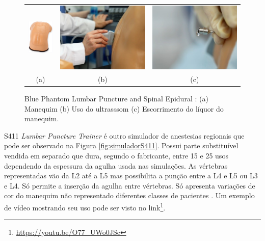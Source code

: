\begin{figure}[ht!]
    \centering
        \begin{tabular}{ccc}
        \includegraphics[width=0.17\linewidth]{capitulos/figuras/BluePhatom-manequim.png} & 
        \includegraphics[width=0.3\linewidth]{capitulos/figuras/BluePhatom-ultrassom.jpg} 
        &
        \includegraphics[width=0.3\linewidth]{capitulos/figuras/BluePhatom-escorrimentoLiquor.jpg} 
        \\
        (a) & (b) & (c)
        \end{tabular}
    \caption{Blue Phantom Lumbar Puncture and Spinal Epidural \cite{BluePhantom2011}: (a) Manequim (b) Uso do ultrasssom (c) Escorrimento do líquor do manequim.}
    \label{fig:bluePhantom}
\end{figure}

S411 \textit{Lumbar Puncture Trainer} é outro simulador de anestesias regionais que pode ser observado na Figura \ref{fig:simuladorS411}. Possui parte substituível vendida em separado que dura, segundo o fabricante, entre 15 e 25 usos dependendo da espessura da agulha usada nas simulações. As vértebras representadas vão da L2 até a L5 mas possibilita a punção entre a L4 e L5 ou L3 e L4. Só permite a inserção da agulha entre vértebras. Só apresenta variações de cor do manequim não representado diferentes classes de pacientes \cite{GaumardScientific}. Um exemplo de vídeo mostrando seu uso pode ser visto no link\footnote{\url{https://youtu.be/O77\_UWo0JSc}}.

